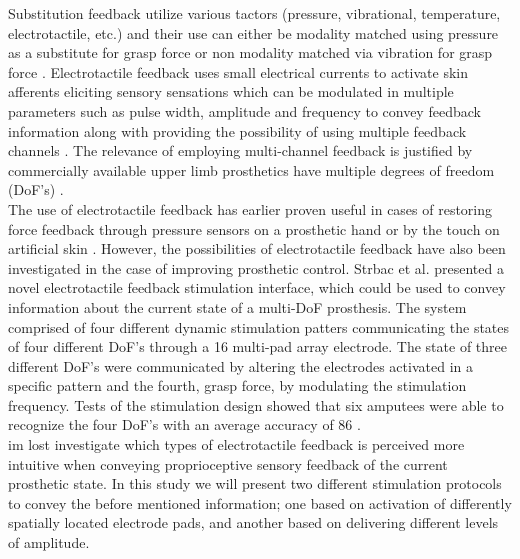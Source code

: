 Substitution feedback utilize various tactors (pressure, vibrational, temperature, electrotactile, etc.) and their use can either be modality matched using pressure as a substitute for grasp force \cite{Godfrey2017} or non modality matched via vibration for grasp force \cite{Ninu2014,Nabeel2016}. 
Electrotactile feedback uses small electrical currents to activate skin afferents eliciting sensory sensations which can be modulated in multiple parameters such as pulse width, amplitude and frequency to convey feedback information along with providing the possibility of using multiple feedback channels \cite{Geng2012}. The relevance of employing multi-channel feedback is justified by commercially available upper limb prosthetics have multiple degrees of freedom (DoF's) \cite{Cordella2016}. \\
%
The use of electrotactile feedback has earlier proven useful in cases of restoring force feedback through pressure sensors on a prosthetic hand or by the touch on artificial skin \cite{Hartmann2014,Franceschi2015}. However, the possibilities of electrotactile feedback have also been investigated in the case of improving prosthetic control. Strbac et al. \cite{Strbac2016} presented a novel electrotactile feedback stimulation interface, which could be used to convey information about the current state of a multi-DoF prosthesis. The system comprised of four different dynamic stimulation patters communicating the states of four different DoF's through a 16 multi-pad array electrode. The state of three different DoF's were communicated by altering the electrodes activated in a specific pattern and the fourth, grasp force, by modulating the stimulation frequency. Tests of the stimulation design showed that six amputees were able to recognize the four DoF's with an average accuracy of 86 \percent. \cite{Strbac2016} \\   
%
im lost investigate which types of electrotactile feedback is perceived more intuitive when conveying proprioceptive sensory feedback of the current prosthetic state. In this study we will present two different stimulation protocols to convey the before mentioned information; one based on activation of differently spatially located electrode pads, and another based on delivering different levels of amplitude.      


 
